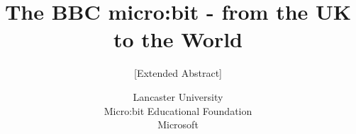 \documentclass{research4cacm}
\begin{document}
%

\title{The BBC micro:bit - from the UK to the World
%
}
\subtitle{[Extended Abstract]
}
%
%
%
%
%
%
\author{
%
%
\alignauthor Lancaster University \\
\alignauthor Micro:bit Educational Foundation \\
\alignauthor Microsoft \\
}
\end{document}
